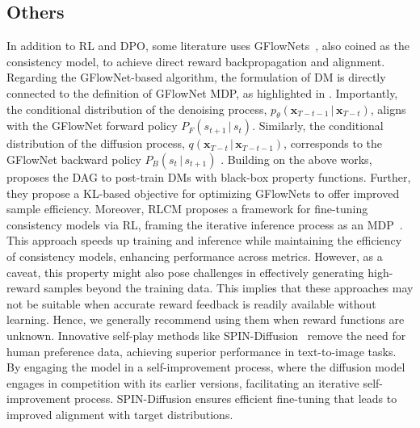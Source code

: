 \subsection{Others}

In addition to RL and DPO, some literature uses GFlowNets~\citep{bengio2023gflownet}, also coined as the consistency model, to achieve direct reward backpropagation and alignment. Regarding the GFlowNet-based algorithm, the formulation of DM is directly connected to the definition of GFlowNet MDP, as highlighted in \citep{zhang2022unifying}. Importantly, the conditional distribution of the denoising process, $p_\theta(\mathbf{x}_{T-t-1} \, | \, \mathbf{x}_{T-t})$, aligns with the GFlowNet forward policy $P_F(s_{t+1} \, | \, s_t)$. Similarly, the conditional distribution of the diffusion process, $q(\mathbf{x}_{T-t} \, | \, \mathbf{x}_{T-t-1})$, corresponds to the GFlowNet backward policy $P_B(s_t \, | \, s_{t+1})$ \citep{lahlou2023theory}. Building on the above works, 
\citet{zhang2024improving} proposes the
DAG to post-train DMs with
black-box property functions. Further, they propose a KL-based objective for optimizing GFlowNets to offer improved sample efficiency. Moreover, RLCM proposes a framework for fine-tuning consistency models via RL, framing the iterative inference process as an MDP~\citep{oertell2024rl}. This approach speeds up training and inference while maintaining the efficiency of consistency models, enhancing performance across metrics. However, as a caveat, this property might also pose challenges in effectively generating high-reward samples beyond the training data. This implies that these approaches may not be suitable when accurate reward feedback is readily available without learning. Hence, we generally recommend using them when reward functions are unknown. Innovative self-play methods like SPIN-Diffusion~\citep{yuan2024self} remove the need for human preference data, achieving superior performance in text-to-image tasks. By engaging the model in a self-improvement process, where the diffusion
model engages in competition with its earlier versions, facilitating an iterative self-improvement
process. SPIN-Diffusion ensures efficient fine-tuning that leads to improved alignment with target distributions.

